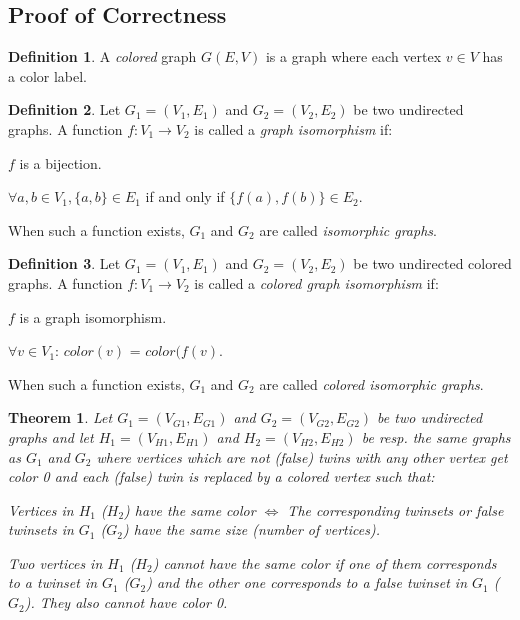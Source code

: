\documentclass[twoside]{article}
\theoremstyle{definition}
\newtheorem{definition}{Definition}
\theoremstyle{plain}
\newtheorem{theorem}{Theorem}
\begin{document}
\begin{multicols}{2}
\section{Proof of Correctness}
\begin{definition}
A \emph{colored} graph $G(E,V)$ is a graph where each vertex $v \in V$ has a color label.
\end{definition}
\begin{definition}\label{def:iso}
Let $G_1 = (V_1, E_1)$ and $G_2 = (V_2, E_2)$ be two undirected graphs. A function $f: V_1 \to V_2$ is called a \emph{graph isomorphism} if:
\begin{compactenum}[\upshape(a)]
\item $f$ is a bijection. \label{voorwaarde1}
\item $\forall a, b \in V_1, \{a, b\} \in E_1$ if and only if $\{f(a), f(b)\} \in E_2$.\label{voorwaarde2}
\end{compactenum}
When such a function exists, $G_1$ and $G_2$ are called \emph{isomorphic graphs}. 
\end{definition}
\begin{definition}\label{def:coloriso}
Let $G_1 = (V_1, E_1)$ and $G_2 = (V_2, E_2)$ be two undirected colored graphs. A function $f: V_1 \to V_2$ is called a \emph{colored graph isomorphism} if: 
\begin{compactenum}[\upshape(a)]
\item $f$ is a graph isomorphism.\label{voorwaarde4}
\item $\forall v \in V_1$: $color(v)$ = $color (f(v)$. \label{voorwaarde3}
\end{compactenum}
When such a function exists, $G_1$ and $G_2$ are called \emph{colored isomorphic graphs}. 
\end{definition}
\begin{theorem}
Let $G_1 = (V_{G1}, E_{G1})$ and $G_2 = (V_{G2}, E_{G2})$ be two undirected  graphs and let $H_1 = (V_{H1}, E_{H1})$ and $H_2 = (V_{H2}, E_{H2})$ be resp. the same graphs as $G_1$ and $G_2$ where vertices which are not (false) twins with any other vertex get color 0 and each (false) twin is replaced by a colored vertex such that: \begin{compactenum}[\upshape(a)]
\item Vertices in $H_1$ ($H_2$) have the same color $\iff$ The corresponding twinsets or false twinsets in $G_1$ ($G_2$) have the same size (number of vertices).
\item Two vertices in $H_1$ ($H_2$) cannot have the same color if one of them corresponds to a twinset in $G_1$ ($G_2$) and the other one corresponds to a false twinset in $G_1$ ($G_2$). They also cannot have color 0.

\end{compactenum}
\end{theorem}
\end{multicols}
\end{document}
